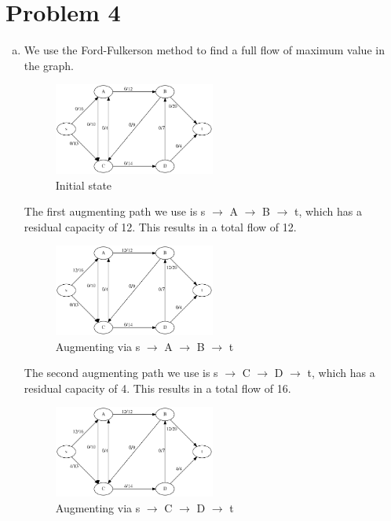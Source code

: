 \documentclass[a4paper, 10pt, twoside]{article}
\begin{document}
\section*{Problem 4}
\begin{enumerate}[a)]
	\item We use the Ford-Fulkerson method to find a full flow of maximum value in the graph.
	
	\begin{figure}[h]
		\centering
		\includegraphics[width=0.5\textwidth]{img/init.png}
		\caption{Initial state}
	\end{figure}

	The first augmenting path we use is s $\rightarrow$ A $\rightarrow$ B $\rightarrow$ t, which has a residual capacity of 12. This results in a total flow of 12.

	\begin{figure}[h]
		\centering
		\includegraphics[width=0.5\textwidth]{img/path1.png}
		\caption{Augmenting via s $\rightarrow$ A $\rightarrow$ B $\rightarrow$ t}
	\end{figure}

	The second augmenting path we use is s $\rightarrow$ C $\rightarrow$ D $\rightarrow$ t, which has a residual capacity of 4. This results in a total flow of 16.

	\begin{figure}[h]
		\centering
		\includegraphics[width=0.5\textwidth]{img/path2.png}
		\caption{Augmenting via s $\rightarrow$ C $\rightarrow$ D $\rightarrow$ t}
	\end{figure}


\end{enumerate}
\end{document}
